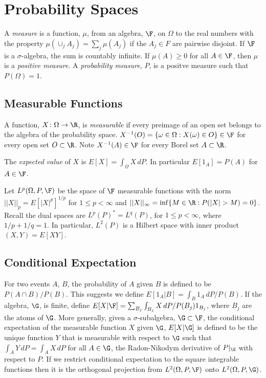 \section{Probability Spaces}
A {\em measure} is a function, $\mu$, from an algebra, $\F$, on $\Omega$
to the real numbers with the property  
$\mu(\cup_j A_j) = \sum_j \mu(A_j)$ if the $A_j\in F$ are pairwise disjoint.
If $\F$ is a $\sigma$-algebra, the sum is countably infinite. If 
$\mu(A) \ge0$ for all $A\in\F$, then $\mu$ is a {\em positive measure}.
A {\em probability measure}, $P$, is a positve measure such that $P(\Omega) = 1$.

\subsection{Measurable Functions}
A function, $X\colon\Omega\to\R$, is {\em measurable} if every preimage
of an open set belongs to the algebra of the probability space.
$X^{-1}(O) = \{\omega\in\Omega:X(\omega)\in O\}\in\F$ for every open set $O\subset\R$.
Note $X^{-1}(A)\in\F$ for every Borel set $A\subset\R$.

The {\em expected value} of $X$ is $E[X] = \int_\Omega X\,dP$. In particular
$E[1_A] = P(A)$ for $A\in\F$.

Let $L^p(\Omega, P, \F)$ be the space of $\F$ measurable functions with
the norm $||X||_p = E[|X|^p]^{1/p}$ for $1\le p < \infty$ and
$||X||_\infty = \inf \{M\in\R : P(|X| > M) = 0\}$. Recall the dual spaces
are $L^p(P)^* = L^q(P)$, for $1 \le p < \infty$, where $1/p + 1/q = 1$. In
particular, $L^2(P)$ is a Hilbert space with inner product
$(X, Y) = E[XY]$.

\subsection{Conditional Expectation}
For two events $A$, $B$, the probability of $A$ given $B$ is defined to
be $P(A\cap B)/P(B)$. This suggests we define $E[1_A|B] = \int_B 1_A\,dP/P(B)$.
If the algebra, $\G$, is finite, define $E[X|\F] = \sum_{B_j} \int_{B_j} X\,dP/P(B_j) 1_{B_j}$,
where $B_j$ are the atoms of $\G$.
More generally,
given a $\sigma$-subalgebra, $\G\subset\F$,
the conditional expectation of the measurable function $X$ given $\G$,
$E[X|\G]$ is defined to be the unique function $Y$ that is measurable
with respect to $\G$ such that $\int_A Y\,dP = \int_A X\,dP$ for all
$A\in\G$, the Radon-Nikodym derivative of $P|_\G$ with respect to $P$.
If we restrict conditional expectation to the square integrable functions
then it is the orthogonal projection from $L^2(\Omega, P, \F)$ onto $L^2(\Omega, P, \G)$.

